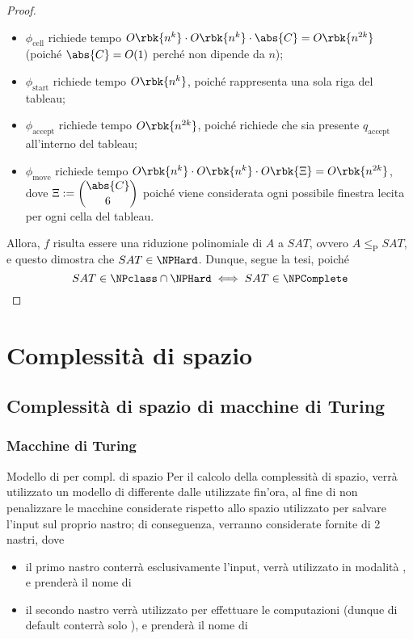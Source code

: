 \documentclass[a4paper, 12pt]{report}
\begin{document}
\begin{proof}
        \begin{itemize}
            \item $\phi_\mathrm{cell}$ richiede tempo $O\rbk{n^k} \cdot O\rbk{n^k} \cdot \abs{C} = O\rbk{n^{2k}}$ (poiché $\abs{C} = O(1)$ perché non dipende da $n$);
            \item $\phi_\mathrm{start}$ richiede tempo $O\rbk{n^k}$, poiché rappresenta una sola riga del tableau;
            \item $\phi_\mathrm{accept}$ richiede tempo $O\rbk{n^{2k}}$, poiché richiede che sia presente $q_\mathrm{accept}$ all'interno del tableau;
            \item $\phi_\mathrm{move}$ richiede tempo $O\rbk{n^{k}} \cdot O\rbk{n^k} \cdot O\rbk{\Xi} = O\rbk{n^{2k}}$, dove $\Xi := \displaystyle \binom{\abs{C}}{6}$ poiché viene considerata ogni possibile finestra lecita per ogni cella del tableau.
        \end{itemize}

        Allora, $f$ risulta essere una riduzione polinomiale di $A$ a $SAT$, ovvero $A \leq_\mathrm P SAT$, e questo dimostra che $SAT \in \NPHard$. Dunque, segue la tesi, poiché $$SAT \in \NPclass \cap \NPHard \iff SAT \in \NPComplete$$
    \end{proof}

    \chapter{Complessità di spazio}

    \section{Complessità di spazio di macchine di Turing}

    \subsection{Macchine di Turing}

    \begin{framedobs}[label={space model}]{Modello di \TM per compl. di spazio}
        Per il calcolo della complessità di spazio, verrà utilizzato un modello di \TM differente dalle \TM utilizzate fin'ora, al fine di non penalizzare le macchine considerate rispetto allo spazio utilizzato per salvare l'input sul proprio nastro; di conseguenza, verranno considerate \TM fornite di 2 nastri, dove

        \begin{itemize}
            \item il primo nastro conterrà esclusivamente l'input, verrà utilizzato in modalità , e prenderà il nome di 
            \item il secondo nastro verrà utilizzato per effettuare le computazioni (dunque di default conterrà solo \blankchar), e prenderà il nome di 
        \end{itemize}
    \end{framedobs}
\end{document}
